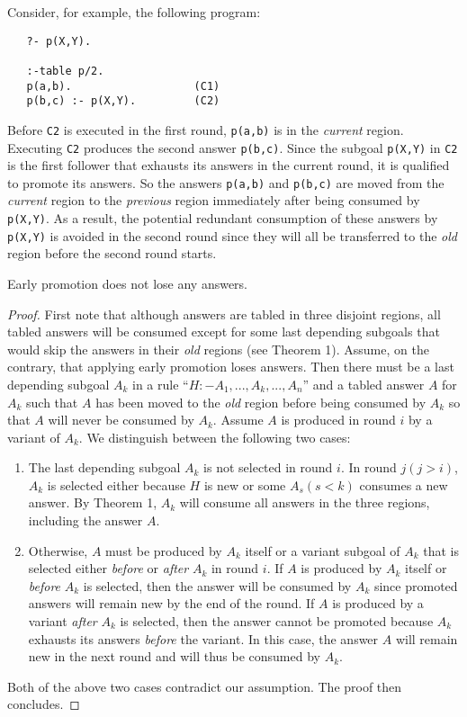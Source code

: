 \documentclass{tlp}
\begin{document}
Consider, for example, the following program:
\begin{verbatim}
   ?- p(X,Y).

   :-table p/2.
   p(a,b).                   (C1)
   p(b,c) :- p(X,Y).         (C2)
\end{verbatim}
Before {\tt C2} is executed in the first round, {\tt p(a,b)} is in the {\it current} region. Executing {\tt C2} produces the second answer {\tt p(b,c)}. Since the subgoal {\tt p(X,Y)} in {\tt C2} is the first follower that exhausts its answers in the current round, it is qualified to promote its answers. So the answers {\tt p(a,b)} and {\tt p(b,c)} are moved from the {\it current} region to the {\it previous} region immediately after being consumed by {\tt p(X,Y)}. As a result, the potential redundant consumption of these answers by {\tt p(X,Y)} is avoided in the second round since they will all be transferred to the {\it old} region before the second round starts.

\begin{theorem}
Early promotion does not lose any answers. 
\end{theorem}

\begin{proof}
First note that although answers are tabled in three disjoint regions, all tabled answers will be consumed except for some last depending subgoals that would skip the answers in their {\it old} regions (see Theorem 1). Assume, on the contrary, that applying early promotion loses answers. Then there must be a last depending subgoal $A_k$ in a rule ``$H$$:$$-$$A_1,...,A_k,...,A_n$'' and a tabled answer $A$ for $A_k$ such that $A$ has been moved to the {\it old} region before being consumed by $A_k$ so that $A$ will never be consumed by $A_k$. Assume $A$ is produced in round $i$ by a variant of $A_k$. We distinguish between the following two cases:

\begin{enumerate}
\item The last depending subgoal $A_k$ is not selected in round $i$. In round $j (j>i)$, $A_k$ is selected either because $H$ is new or some $A_s (s<k)$ consumes a new answer. By Theorem 1, $A_k$ will consume all answers in the three regions, including the answer $A$.

\item Otherwise, $A$ must be produced by $A_k$ itself or a variant subgoal of $A_k$ that is selected either {\it before} or {\it after} $A_k$ in round $i$. If $A$ is produced by $A_k$ itself or {\it before} $A_k$ is selected, then the answer will be consumed by $A_k$ since promoted answers will remain new by the end of the round. If $A$ is produced by a variant {\it after} $A_k$ is selected, then the answer cannot be promoted because $A_k$ exhausts its answers {\it before} the variant. In this case, the answer $A$ will remain new in the next round and will thus be consumed by $A_k$.
\end{enumerate}

Both of the above two cases contradict our assumption. The proof then concludes.
\end{proof}
\end{document}

